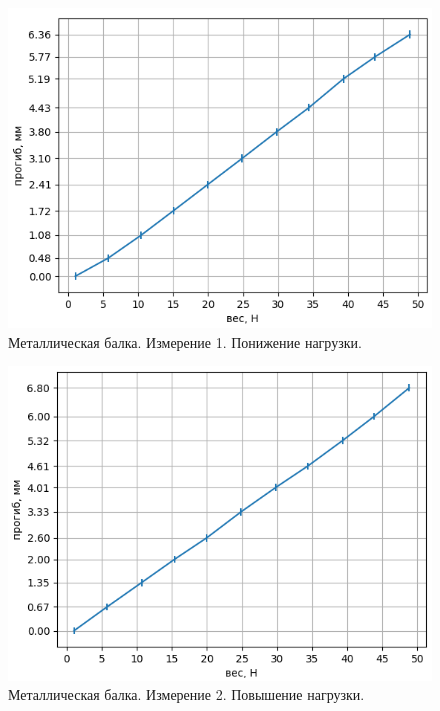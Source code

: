 \documentclass{article}
\begin{document}
\begin{figure}
    \centering
    \includegraphics[width=0.9\linewidth]{металл 1 убыв.png}
    \caption{Металлическая балка. Измерение 1. Понижение нагрузки.}
    \label{fig:enter-label}
\end{figure}

\begin{figure}
    \centering
    \includegraphics[width=0.9\linewidth]{металл 2 возраст.png}
    \caption{Металлическая балка. Измерение 2. Повышение нагрузки.}
    \label{fig:enter-label}
\end{figure}
\end{document}
